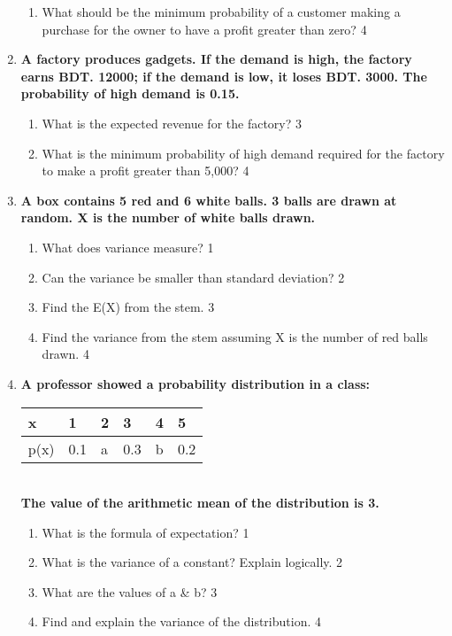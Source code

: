 \documentclass[a4paper,oneside, margin=1.4in]{book}
\begin{document}
\begin{enumerate}
\begin{enumerate}
    \item
    What should be the minimum probability of a customer making a purchase for the owner to have a profit greater than zero? \hfill 4
\end{enumerate}

\item
\textbf{A factory produces gadgets. If the demand is high, the factory earns BDT. 12000; if the demand is low, it loses BDT. 3000. The probability of high demand is 0.15.}

\begin{enumerate}
    \item
    What is the expected revenue for the factory? \hfill 3

    \item
    What is the minimum probability of high demand required for the factory to make a profit greater than 5,000? \hfill 4
\end{enumerate}

  
     \item
	  \textbf{A box contains 5 red and 6 white balls. 3 balls are drawn at random. X is the number of white balls drawn.} 
  
  \begin{enumerate}
    \item
	What does variance measure? \hfill 1
    \item
	Can the variance be smaller than standard deviation? \hfill 2
    \item  
	Find the E(X) from the stem. \hfill 3
    \item
	Find the variance from the stem assuming X is the number of red balls drawn. \hfill 4
  \end{enumerate}
  
   \item
	  \textbf{A professor showed a probability distribution in a class:}
	  
	  \begin{table}[h]
	  \begin{center}
\begin{tabular}{llllll}
x    & 1   & 2 & 3   & 4 & 5   \\ \hline
p(x) & 0.1 & a & 0.3 & b & 0.2 
\end{tabular} \\
\textbf{The value of the arithmetic mean of the distribution is 3.}
\end{center}	
\end{table}
    
  \begin{enumerate}
    \item
	What is the formula of expectation? \hfill 1
    \item
	What is the variance of a constant? Explain logically. \hfill 2
    \item  
	What are the values of a \& b? \hfill 3
    \item
	Find and explain the variance of the distribution. \hfill 4
  \end{enumerate}
  

\end{enumerate}
\end{document}
